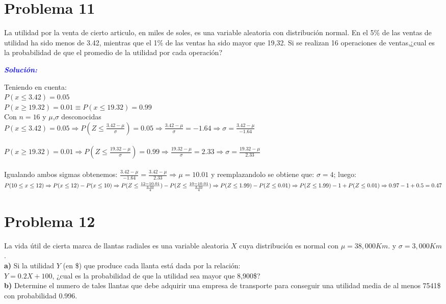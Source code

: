 \documentclass[a4paper,openright,12pt]{book}
\begin{document}
{\newpage

\section{Problema 11}
La utilidad por la venta de cierto articulo, en miles de soles, es una variable aleatoria con distribución normal. En el 5\% de las ventas de utilidad ha sido menos de 3.42, mientras que el 1\% de las ventas ha sido mayor que 19,32. Si se realizan 16 operaciones de ventas,¿cual es la probabilidad de que el promedio de la utilidad por cada operación?

\begin{center}
	\textbf{\textit{\textcolor{blue}{Solución:}}}\\
\end{center}

	\textmd{Teniendo en cuenta:} \\ 
$P(x \leq 3.42)= 0.05$ \\
$P(x \geq 19.32) = 0.01 \equiv P(x \leq 19.32) = 0.99$ \\
\textmd{Con $n = 16$ y  $\mu$,$\sigma$ desconocidas}\\
$P(x \leq 3.42)= 0.05 \Rightarrow P(Z \leq \frac{3.42 -\mu}{\sigma} )= 0.05 \Rightarrow \frac{3.42 -\mu}{\sigma} = -1.64 \Rightarrow \sigma = \frac{3.42 -\mu}{-1.64} $ \\ \\
$P(x \geq 19.32)= 0.01 \Rightarrow P(Z \leq \frac{19.32 -\mu}{\sigma} )= 0.99 \Rightarrow \frac{19.32 -\mu}{\sigma} = 2.33 \Rightarrow \sigma = \frac{19.32 -\mu}{2.33}$\\ \\
\textmd{Igualando ambos sigmas obtenemos: $\frac{3.42 -\mu}{-1.64}=\frac{3.42 -\mu}{2.33}  \Rightarrow \mu = 10.01$ y reemplazandolo se obtiene que: $\sigma =4  $; luego:}\\
$P(10 \leq x \leq 12)\Rightarrow P(x \leq 12) - P(x \leq 10)\Rightarrow P(Z \leq \frac{12-10.01}{\frac{3.99}{4}}) - P(Z \leq \frac{10-10.01}{\frac{3.99}{4}}) \\ \\ \Rightarrow P(Z \leq 1.99) - P(Z \leq 0.01)\Rightarrow P(Z \leq 1.99) - 1 + P(Z \leq 0.01) \Rightarrow 0.97 - 1 + 0.5 = 0.47$

\section{Problema 12}
La vida útil de cierta marca de llantas radiales es una variable aleatoria $X$ cuya distribución es normal con $\mu=38,000 Km$. y $\sigma=3,000 Km$.\\
\textbf{a)} Si la utilidad $Y$ (en \$) que produce cada llanta está dada por la relación:\\
$Y=0.2X+100$, ¿cual es la probabilidad de que la utilidad sea mayor que 8,900\$?\\
\textbf{b)} Determine el numero de tales llantas que debe adquirir una empresa de transporte para conseguir una utilidad media de al menos 7541\$ con probabilidad 0.996.

}
\end{document}
